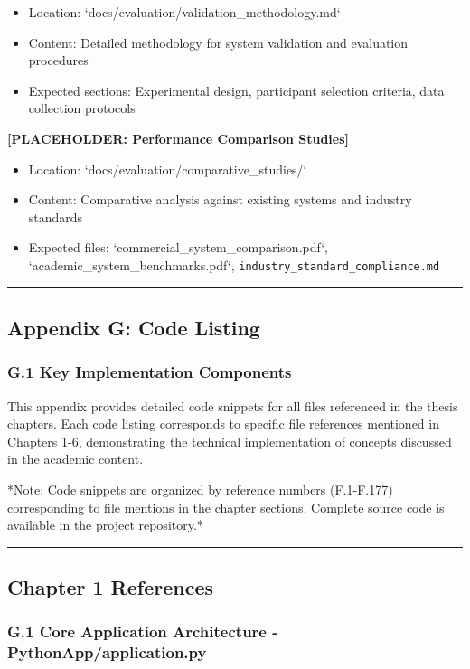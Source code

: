 \documentclass[11pt,a4paper]{article}
\begin{document}
\begin{itemize}
\item Location: `docs/evaluation/validation_methodology.md`
\item Content: Detailed methodology for system validation and evaluation procedures
\item Expected sections: Experimental design, participant selection criteria, data collection protocols

\end{itemize}
\textbf{[PLACEHOLDER: Performance Comparison Studies]}

\begin{itemize}
\item Location: `docs/evaluation/comparative_studies/`
\item Content: Comparative analysis against existing systems and industry standards
\item Expected files: `commercial_system_comparison.pdf`, `academic_system_benchmarks.pdf`,
  \texttt{industry\_standard\_compliance.md}

\end{itemize}
\hrule

\subsection{Appendix G: Code Listing}

\subsubsection{G.1 Key Implementation Components}

This appendix provides detailed code snippets for all files referenced in the thesis chapters. Each code listing
corresponds to specific file references mentioned in Chapters 1-6, demonstrating the technical implementation of
concepts discussed in the academic content.

*Note: Code snippets are organized by reference numbers (F.1-F.177) corresponding to file mentions in the chapter
sections. Complete source code is available in the project repository.*

\hrule

\subsection{Chapter 1 References}

\subsubsection{G.1 Core Application Architecture - PythonApp/application.py}
\end{document}
